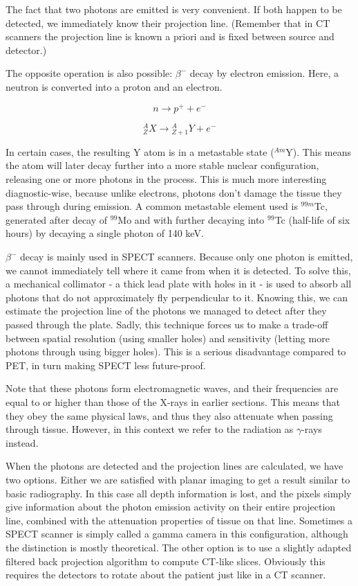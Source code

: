 The fact that two photons are emitted is very convenient. If both happen to be
detected, we immediately know their projection line. (Remember that in CT
scanners the projection line is known a priori and is fixed between source and
detector.)

The opposite operation is also possible: $\beta^-$ decay by electron emission.
Here, a neutron is converted into a proton and an electron.

\begin{equation}
	n \rightarrow p^+ + e^-
\end{equation}

\begin{equation}
	{}_Z^AX \rightarrow {}_{Z+1}^AY + e^-
\end{equation}

In certain cases, the resulting Y atom is in a metastable state ($^{Am}$Y).
This means the atom will later decay further into a more stable nuclear
configuration, releasing one or more photons in the process. This is much more
interesting diagnostic-wise, because unlike electrons, photons don't damage the
tissue they pass through during emission. A common metastable element
used is $^{99m}$Tc, generated after decay of $^{99}$Mo and with further decaying
into $^{99}$Tc (half-life of six hours) by decaying a single photon of 140 keV.


$\beta^-$ decay is mainly used in SPECT scanners. Because only one photon is
emitted, we cannot immediately tell where it came from when it is detected. To
solve this, a mechanical collimator - a thick lead plate with holes in it - is
used to absorb all photons that do not approximately fly perpendicular to it.
Knowing this, we can estimate the projection line of the photons we managed to
detect after they passed through the plate. Sadly, this technique forces us to
make a trade-off between spatial resolution (using smaller holes) and
sensitivity (letting more photons through using bigger holes). This is a serious
disadvantage compared to PET, in turn making SPECT less future-proof.

Note that these photons form electromagnetic waves, and their frequencies are
equal to or higher than those of the X-rays in earlier sections. This means that
they obey the same physical laws, and thus they also attenuate when passing
through tissue. However, in this context we refer to the radiation as
$\gamma$-rays instead.

When the photons are detected and the projection lines are calculated, we have
two options. Either we are satisfied with planar imaging to get a result similar
to basic radiography. In this case all depth information is lost, and the pixels
simply give information about the photon emission activity on their entire
projection line, combined with the attenuation properties of tissue on that
line. Sometimes a SPECT scanner is simply called a gamma camera in this
configuration, although the distinction is mostly theoretical. The other option
is to use a slightly adapted filtered back projection algorithm to compute
CT-like slices. Obviously this requires the detectors to rotate about the
patient just like in a CT scanner.


